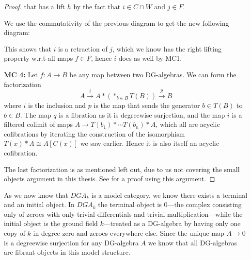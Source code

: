\begin{proof}
that has a lift $h$ by the fact that $i\in C\cap W$ and $j\in F$. 

We use the commutativity of the previous diagram to get the new following diagram: 
\begin{center}
\end{center}
This shows that $i$ is a retraction of $j$, which we know has the right lifting property w.r.t all maps $f\in F$, hence $i$ does as well by MC1.



\textbf{MC 4:} Let $f:A\longrightarrow B$ be any map between two DG-algebras. We can form the factorization 
\begin{equation*}
    A\overset{i}\longrightarrow A\ast (\ast_{b\in B} T(B))\overset{p}\longrightarrow B
\end{equation*}
where $i$ is the inclusion and $p$ is the map that sends the generator $b \in T(B)$ to $b\in B$. The map $q$ is a fibration as it is  degreewise surjection, and the map $i$ is a filtered colimit of maps $A\longrightarrow T(b_1)\ast \cdots T(b_n)\ast A$, which all are acyclic cofibrations by iterating the construction of the isomorphism $T(x)\ast A \cong A[C(x)]$ we saw earlier. Hence it is also itself an acyclic cofibration. 

The last factorization is as mentioned left out, due to us not covering the small objects argument in this thesis. See \cite[Lemma 3]{jardine} for a proof using this argument. 
\end{proof}


As we now know that $DGA_k$ is a model category, we know there exists a terminal and an initial object. In $DGA_k$ the terminal object is $0$---the complex consisting only of zeroes with only trivial differentials and trivial multiplication---while the initial object is the ground field $k$---treated as a DG-algebra by having only one copy of $k$ in degree zero and zeroes everywhere else. Since the unique map $A\longrightarrow 0$ is a degreewise surjection for any DG-algebra $A$ we know that all DG-algebras are fibrant objects in this model structure. 




